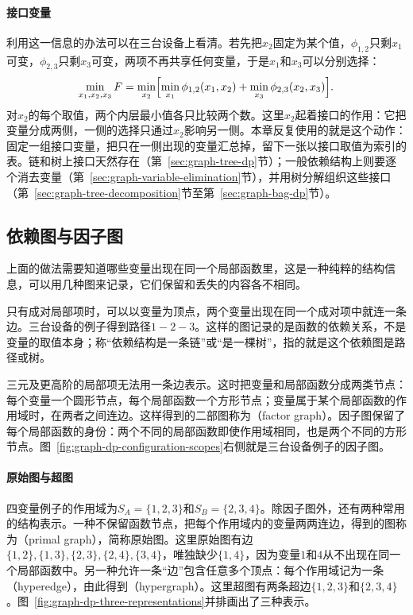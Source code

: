 \paragraph{接口变量}
利用这一信息的办法可以在三台设备上看清。若先把$x_2$固定为某个值，$\phi_{1,2}$只剩$x_1$可变，$\phi_{2,3}$只剩$x_3$可变，两项不再共享任何变量，于是$x_1$和$x_3$可以分别选择：
\[
\min_{x_1,x_2,x_3}F=\min_{x_2}\Bigl[\min_{x_1}\phi_{1,2}(x_1,x_2)+\min_{x_3}\phi_{2,3}(x_2,x_3)\Bigr].
\]
对$x_2$的每个取值，两个内层最小值各只比较两个数。这里$x_2$起着接口的作用：它把变量分成两侧，一侧的选择只通过$x_2$影响另一侧。本章反复使用的就是这个动作：固定一组接口变量，把只在一侧出现的变量汇总掉，留下一张以接口取值为索引的表。链和树上接口天然存在（第~\ref{sec:graph-tree-dp}节）；一般依赖结构上则要逐个消去变量（第~\ref{sec:graph-variable-elimination}节），并用树分解组织这些接口（第~\ref{sec:graph-tree-decomposition}节至第~\ref{sec:graph-bag-dp}节）。

\subsection{依赖图与因子图}
\label{sec:graph-dp-factor-graphs}

上面的做法需要知道哪些变量出现在同一个局部函数里，这是一种纯粹的结构信息，可以用几种图来记录，它们保留和丢失的内容各不相同。

只有成对局部项时，可以以变量为顶点，两个变量出现在同一个成对项中就连一条边。三台设备的例子得到路径$1-2-3$。这样的图记录的是函数的依赖关系，不是变量的取值本身；称“依赖结构是一条链”或“是一棵树”，指的就是这个依赖图是路径或树。

三元及更高阶的局部项无法用一条边表示。这时把变量和局部函数分成两类节点：每个变量一个圆形节点，每个局部函数一个方形节点；变量属于某个局部函数的作用域时，在两者之间连边。这样得到的二部图称为（factor graph）。因子图保留了每个局部函数的身份：两个不同的局部函数即使作用域相同，也是两个不同的方形节点。图~\ref{fig:graph-dp-configuration-scopes}右侧就是三台设备例子的因子图。

\paragraph{原始图与超图}
四变量例子的作用域为$S_A=\{1,2,3\}$和$S_B=\{2,3,4\}$。除因子图外，还有两种常用的结构表示。一种不保留函数节点，把每个作用域内的变量两两连边，得到的图称为（primal graph），简称原始图。这里原始图有边$\{1,2\},\allowbreak\{1,3\},\allowbreak\{2,3\},\allowbreak\{2,4\},\allowbreak\{3,4\}$，唯独缺少$\{1,4\}$，因为变量$1$和$4$从不出现在同一个局部函数中。另一种允许一条“边”包含任意多个顶点：每个作用域记为一条（hyperedge），由此得到（hypergraph）。这里超图有两条超边$\{1,2,3\}$和$\{2,3,4\}$。图~\ref{fig:graph-dp-three-representations}并排画出了三种表示。

